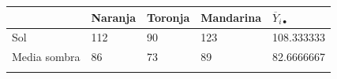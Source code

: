 \documentclass[]{book}
\theoremstyle{definition}
\theoremstyle{definition}
\theoremstyle{definition}
\theoremstyle{remark}
\begin{document}
\begin{longtable}[]{@{}lllll@{}}
\toprule
\begin{minipage}[b]{0.25\columnwidth}\raggedright
\strut
\end{minipage} & \begin{minipage}[b]{0.11\columnwidth}\raggedright
Naranja\strut
\end{minipage} & \begin{minipage}[b]{0.08\columnwidth}\raggedright
Toronja\strut
\end{minipage} & \begin{minipage}[b]{0.11\columnwidth}\raggedright
Mandarina\strut
\end{minipage} & \begin{minipage}[b]{0.31\columnwidth}\raggedright
\(\overline{Y}_{i \bullet}\)\strut
\end{minipage}\tabularnewline
\midrule
\endhead
\begin{minipage}[t]{0.25\columnwidth}\raggedright
Sol\strut
\end{minipage} & \begin{minipage}[t]{0.11\columnwidth}\raggedright
112\strut
\end{minipage} & \begin{minipage}[t]{0.08\columnwidth}\raggedright
90\strut
\end{minipage} & \begin{minipage}[t]{0.11\columnwidth}\raggedright
123\strut
\end{minipage} & \begin{minipage}[t]{0.31\columnwidth}\raggedright
108.333333\strut
\end{minipage}\tabularnewline
\begin{minipage}[t]{0.25\columnwidth}\raggedright
Media sombra\strut
\end{minipage} & \begin{minipage}[t]{0.11\columnwidth}\raggedright
86\strut
\end{minipage} & \begin{minipage}[t]{0.08\columnwidth}\raggedright
73\strut
\end{minipage} & \begin{minipage}[t]{0.11\columnwidth}\raggedright
89\strut
\end{minipage} & \begin{minipage}[t]{0.31\columnwidth}\raggedright
82.6666667\strut
\end{minipage}\tabularnewline
\begin{minipage}[t]{0.25\columnwidth}\raggedright

\end{minipage}
\end{longtable}
\end{document}
